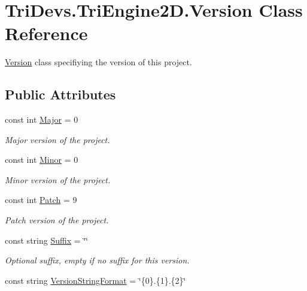 \hypertarget{class_tri_devs_1_1_tri_engine2_d_1_1_version}{\section{Tri\-Devs.\-Tri\-Engine2\-D.\-Version Class Reference}
\label{class_tri_devs_1_1_tri_engine2_d_1_1_version}
}


\hyperlink{class_tri_devs_1_1_tri_engine2_d_1_1_version}{Version} class specifiying the version of this project.  


\subsection*{Public Attributes}
\begin{DoxyCompactItemize}
\item 
const int \hyperlink{class_tri_devs_1_1_tri_engine2_d_1_1_version_adf7439103e5307870f8a9b953e9f3933}{Major} = 0
\begin{DoxyCompactList}\small\item\em Major version of the project. \end{DoxyCompactList}\item 
const int \hyperlink{class_tri_devs_1_1_tri_engine2_d_1_1_version_a46c99b37d8caad10a9702e9823f6cded}{Minor} = 0
\begin{DoxyCompactList}\small\item\em Minor version of the project. \end{DoxyCompactList}\item 
const int \hyperlink{class_tri_devs_1_1_tri_engine2_d_1_1_version_a5baa982b0404ea5ed3d2526e26f55809}{Patch} = 9
\begin{DoxyCompactList}\small\item\em Patch version of the project. \end{DoxyCompactList}\item 
const string \hyperlink{class_tri_devs_1_1_tri_engine2_d_1_1_version_a5f7a61ae54163decac64e6acbe25e76d}{Suffix} = \char`\"{}\char`\"{}
\begin{DoxyCompactList}\small\item\em Optional suffix, empty if no suffix for this version. \end{DoxyCompactList}\item 
const string \hyperlink{class_tri_devs_1_1_tri_engine2_d_1_1_version_a7ff4d8681e4833ef71067425aac665e4}{Version\-String\-Format} = \char`\"{}\{0\}.\{1\}.\{2\}\char`\"{}

\end{DoxyCompactItemize}
